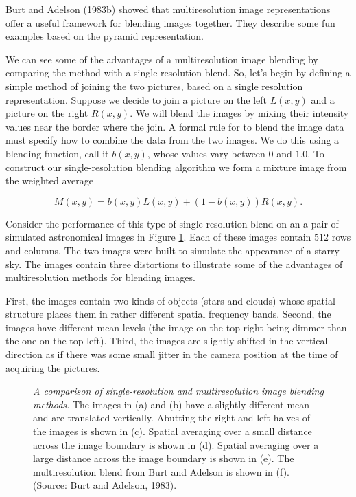 Burt and Adelson (1983b) showed that multiresolution image
representations offer a useful framework for blending images together.
They describe some fun examples based on the pyramid representation.

We can see some of the advantages of a multiresolution image blending
by comparing the method with a single resolution blend.  So, let's
begin by defining a simple method of joining the two pictures, based
on a single resolution representation.  Suppose we decide to join a
picture on the left $L(x,y)$ and a picture on the right $R(x,y)$.  We
will blend the images by mixing their intensity values near the border
where the join.  A formal rule for to blend the image data must
specify how to combine the data from the two images.  We do this using
a blending function, call it $b(x,y)$, whose values vary between $0$
and $1.0$.  To construct our single-resolution blending algorithm we
form a mixture image from the weighted average

\begin{equation}
M(x,y) = b(x,y) L(x,y) + ( 1 - b(x,y)) R(x,y) .
\end{equation}

Consider the performance of this type of single resolution blend on an
a pair of simulated astronomical images in Figure \ref{f7:stars}.
Each of these images contain $512$ rows and columns.  The two images
were built to simulate the appearance of a starry sky.  The images
contain three distortions to illustrate some of the advantages of
multiresolution methods for blending images.

First, the images contain two kinds of objects (stars and clouds)
whose spatial structure places them in rather different spatial
frequency bands.  Second, the images have different mean levels (the
image on the top right being dimmer than the one on the top left).
Third, the images are slightly shifted in the vertical direction as if
there was some small jitter in the camera position at the time of
acquiring the pictures.

\begin{figure}
\centerline{
}
\caption[Image Blending]{
{\em A comparison of single-resolution and multiresolution image
blending methods.}  The images in (a) and (b) have a slightly
different mean and are translated vertically.  Abutting the right and
left halves of the images is shown in (c).  Spatial averaging over a
small distance across the image boundary is shown in (d).  Spatial
averaging over a large distance across the image boundary is shown in
(e).  The multiresolution blend from Burt and Adelson is shown in (f).
(Source: Burt and Adelson, 1983).
}
\label{f7:stars}
\end{figure}

